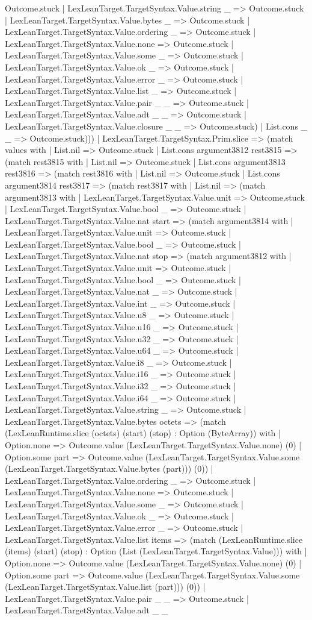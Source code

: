 \documentclass[11pt]{article}
\begin{document}
Outcome.stuck | LexLeanTarget.TargetSyntax.Value.string \_ => Outcome.stuck | LexLeanTarget.TargetSyntax.Value.bytes \_ => Outcome.stuck | LexLeanTarget.TargetSyntax.Value.ordering \_ => Outcome.stuck | LexLeanTarget.TargetSyntax.Value.none => Outcome.stuck | LexLeanTarget.TargetSyntax.Value.some \_ => Outcome.stuck | LexLeanTarget.TargetSyntax.Value.ok \_ => Outcome.stuck | LexLeanTarget.TargetSyntax.Value.error \_ => Outcome.stuck | LexLeanTarget.TargetSyntax.Value.list \_ => Outcome.stuck | LexLeanTarget.TargetSyntax.Value.pair \_ \_ => Outcome.stuck | LexLeanTarget.TargetSyntax.Value.adt \_ \_ => Outcome.stuck | LexLeanTarget.TargetSyntax.Value.closure \_ \_ => Outcome.stuck) | List.cons \_ \_ => Outcome.stuck))) | LexLeanTarget.TargetSyntax.Prim.slice => (match values with | List.nil => Outcome.stuck | List.cons argument3812 rest3815 => (match rest3815 with | List.nil => Outcome.stuck | List.cons argument3813 rest3816 => (match rest3816 with | List.nil => Outcome.stuck | List.cons argument3814 rest3817 => (match rest3817 with | List.nil => (match argument3813 with | LexLeanTarget.TargetSyntax.Value.unit => Outcome.stuck | LexLeanTarget.TargetSyntax.Value.bool \_ => Outcome.stuck | LexLeanTarget.TargetSyntax.Value.nat start => (match argument3814 with | LexLeanTarget.TargetSyntax.Value.unit => Outcome.stuck | LexLeanTarget.TargetSyntax.Value.bool \_ => Outcome.stuck | LexLeanTarget.TargetSyntax.Value.nat stop => (match argument3812 with | LexLeanTarget.TargetSyntax.Value.unit => Outcome.stuck | LexLeanTarget.TargetSyntax.Value.bool \_ => Outcome.stuck | LexLeanTarget.TargetSyntax.Value.nat \_ => Outcome.stuck | LexLeanTarget.TargetSyntax.Value.int \_ => Outcome.stuck | LexLeanTarget.TargetSyntax.Value.u8 \_ => Outcome.stuck | LexLeanTarget.TargetSyntax.Value.u16 \_ => Outcome.stuck | LexLeanTarget.TargetSyntax.Value.u32 \_ => Outcome.stuck | LexLeanTarget.TargetSyntax.Value.u64 \_ => Outcome.stuck | LexLeanTarget.TargetSyntax.Value.i8 \_ => Outcome.stuck | LexLeanTarget.TargetSyntax.Value.i16 \_ => Outcome.stuck | LexLeanTarget.TargetSyntax.Value.i32 \_ => Outcome.stuck | LexLeanTarget.TargetSyntax.Value.i64 \_ => Outcome.stuck | LexLeanTarget.TargetSyntax.Value.string \_ => Outcome.stuck | LexLeanTarget.TargetSyntax.Value.bytes octets => (match (LexLeanRuntime.slice (octets) (start) (stop) : Option (ByteArray)) with | Option.none => Outcome.value (LexLeanTarget.TargetSyntax.Value.none) (0) | Option.some part => Outcome.value (LexLeanTarget.TargetSyntax.Value.some (LexLeanTarget.TargetSyntax.Value.bytes (part))) (0)) | LexLeanTarget.TargetSyntax.Value.ordering \_ => Outcome.stuck | LexLeanTarget.TargetSyntax.Value.none => Outcome.stuck | LexLeanTarget.TargetSyntax.Value.some \_ => Outcome.stuck | LexLeanTarget.TargetSyntax.Value.ok \_ => Outcome.stuck | LexLeanTarget.TargetSyntax.Value.error \_ => Outcome.stuck | LexLeanTarget.TargetSyntax.Value.list items => (match (LexLeanRuntime.slice (items) (start) (stop) : Option (List (LexLeanTarget.TargetSyntax.Value))) with | Option.none => Outcome.value (LexLeanTarget.TargetSyntax.Value.none) (0) | Option.some part => Outcome.value (LexLeanTarget.TargetSyntax.Value.some (LexLeanTarget.TargetSyntax.Value.list (part))) (0)) | LexLeanTarget.TargetSyntax.Value.pair \_ \_ => Outcome.stuck | LexLeanTarget.TargetSyntax.Value.adt \_ \_ 
\end{document}
